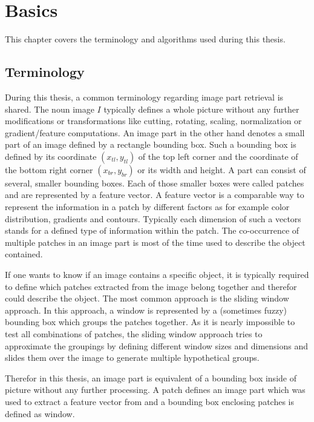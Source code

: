 \chapter{Basics}

This chapter covers the terminology and algorithms used during this thesis. 

\section{Terminology}

During this thesis, a common terminology regarding image part retrieval is shared. The noun image $I$ typically defines a whole picture without any further modifications or transformations like cutting, rotating, scaling, normalization or gradient/feature computations. An image part in the other hand denotes a small part of an image defined by a rectangle bounding box. Such a bounding box is defined by its coordinate $(x_{tl},y_{tl})$ of the top left corner and the coordinate of the bottom right corner $(x_{br},y_{br})$ or its width and height. A part can consist of several, smaller bounding boxes. Each of those smaller boxes were called patches and are represented by a feature vector. A feature vector is a comparable way to represent the information in a patch by different factors as for example color distribution, gradients and contours. Typically each dimension of such a vectors stands for a defined type of information within the patch. The co-occurrence of multiple patches in an image part is most of the time used to describe the object contained.

If one wants to know if an image contains a specific object, it is typically required to define which patches extracted from the image belong together and therefor could describe the object. The most common approach is the sliding window approach. In this approach, a window is represented by a (sometimes fuzzy) bounding box which groups the patches together. As it is nearly impossible to test all combinations of patches, the sliding window approach tries to approximate the groupings by defining different window sizes and dimensions and slides them over the image to generate multiple hypothetical groups.

Therefor in this thesis, an image part is equivalent of a bounding box inside of picture without any further processing. A patch defines an image part which was used to extract a feature vector from and a bounding box enclosing patches is defined as window.